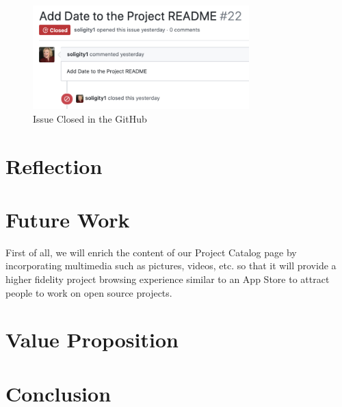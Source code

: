 \documentclass[12pt]{article}
\renewcommand{\_}{\kern-1.5pt\textunderscore\kern-1.5pt}
\begin{document}
\begin{figure}[H]
	\centering
	\includegraphics[height=4cm]{graphs/45. issue_closed}
	\caption{Issue Closed in the GitHub}
\end{figure}


\renewcommand\thesection{\arabic{section}}
\renewcommand\thesubsection{\thesection.\arabic{subsection}}

\section{Reflection}


\section{Future Work}
First of all, we will enrich the content of our Project Catalog page by incorporating multimedia such as pictures, videos, etc. so that it will provide a higher fidelity project browsing experience similar to an App Store to attract people to work on open source projects.



\section{Value Proposition}


\section{Conclusion}

\newpage


\begingroup
\raggedright

{}

\nocite{*}

\endgroup

\newpage
\end{document}
